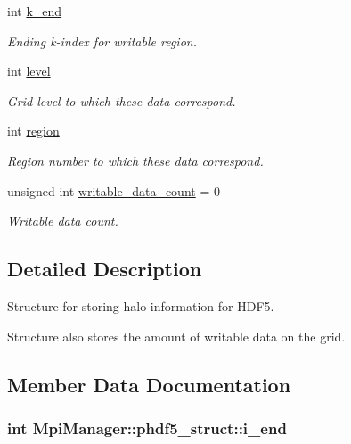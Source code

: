 \begin{DoxyCompactItemize}
int \hyperlink{struct_mpi_manager_1_1phdf5__struct_a2490c17798ca6cf4db002fa521f170c0}{k\+\_\+end}
\begin{DoxyCompactList}\small\item\em Ending k-\/index for writable region. \end{DoxyCompactList}\item 
int \hyperlink{struct_mpi_manager_1_1phdf5__struct_aa3f8cc807724b61ef3a37509f71100ab}{level}
\begin{DoxyCompactList}\small\item\em Grid level to which these data correspond. \end{DoxyCompactList}\item 
int \hyperlink{struct_mpi_manager_1_1phdf5__struct_a1a9978693d5b50cb83b8ccc78fb23a6d}{region}
\begin{DoxyCompactList}\small\item\em Region number to which these data correspond. \end{DoxyCompactList}\item 
unsigned int \hyperlink{struct_mpi_manager_1_1phdf5__struct_a5b487966cec847dfba96a869e9adb7f0}{writable\+\_\+data\+\_\+count} = 0
\begin{DoxyCompactList}\small\item\em Writable data count. \end{DoxyCompactList}\end{DoxyCompactItemize}


\subsection{Detailed Description}
Structure for storing halo information for H\+D\+F5. 

Structure also stores the amount of writable data on the grid. 

\subsection{Member Data Documentation}
\subsubsection[{\texorpdfstring{i\+\_\+end}{i_end}}]{\setlength{\rightskip}{0pt plus 5cm}int Mpi\+Manager\+::phdf5\+\_\+struct\+::i\+\_\+end}\hypertarget{struct_mpi_manager_1_1phdf5__struct_a28567c9488624c7de401c9ee5c5fa13e}{}\label{struct_mpi_manager_1_1phdf5__struct_a28567c9488624c7de401c9ee5c5fa13e}


